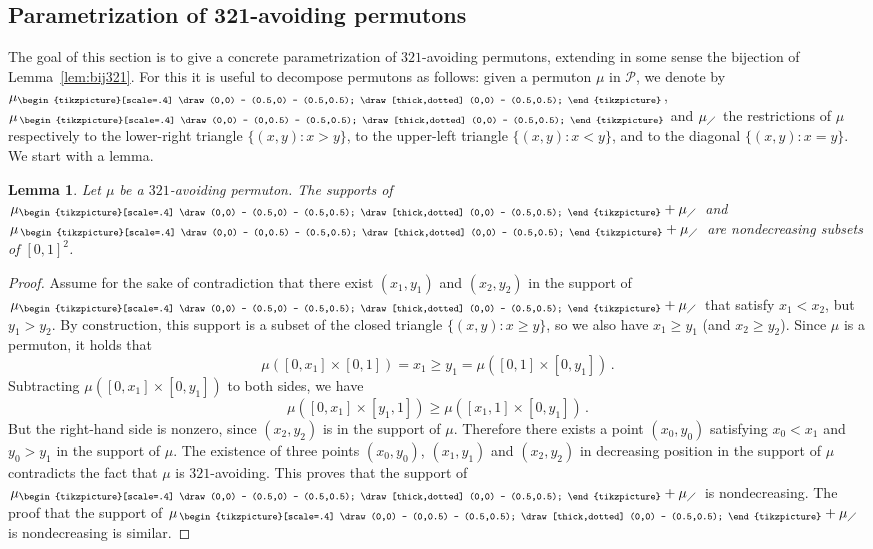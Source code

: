 \documentclass[a4paper,11pt]{amsart}
\DeclareMathOperator{\Leb}{Leb}
\newtheorem{lem}[thm]{Lemma}
\theoremstyle{definition}
\newcommand{\lrtriangle}{{\begin{tikzpicture}[scale=.4]
  \draw (0,0) -- (0.5,0) -- (0.5,0.5);
  \draw[thick,dotted] (0,0) -- (0.5,0.5);
\end{tikzpicture}}}
\newcommand{\ultriangle}{{\, \begin{tikzpicture}[scale=.4]
  \draw (0,0) -- (0,0.5) -- (0.5,0.5);
  \draw[thick,dotted] (0,0) -- (0.5,0.5);
\end{tikzpicture}}}
\begin{document}
\subsection{Parametrization of 321-avoiding permutons}

The goal of this section is to give a concrete parametrization of $321$-avoiding permutons, extending in some sense the bijection of Lemma~\ref{lem:bij321}.
For this it is useful to decompose permutons as follows:
given a permuton $\mu$ in $\mathcal P$, we denote by $\mu_{\lrtriangle}$, $\mu_{\ultriangle}$ and $\mu_{\diagup}$
the restrictions of $\mu$ respectively to the lower-right triangle $\{(x,y): x>y\}$, to the upper-left triangle $\{(x,y): x<y\}$,
and to the diagonal $\{(x,y): x=y\}$.
We start with a lemma.

\begin{lem}\label{lem:incr_supports}
Let $\mu$ be a $321$-avoiding permuton.
The supports of $\mu_{\lrtriangle} + \mu_{\diagup}$ and  $\mu_{\ultriangle} + \mu_{\diagup}$ are nondecreasing subsets of $[0,1]^2$.
\end{lem}

\begin{proof}
    Assume for the sake of contradiction that there exist $(x_1,y_1)$ and $(x_2,y_2)$ in the support of $\mu_{\lrtriangle} + \mu_{\diagup}$ that satisfy $x_1 <x_2$, but $y_1>y_2$. 
    By construction, this support is a subset of the closed triangle $\{(x,y): x\ge y\}$, so we also have $x_1 \ge y_1$ (and $x_2 \ge y_2$).
    Since $\mu$ is a permuton, it holds
    that
    \[ 
        \mu([0,x_1] \times [0,1]) =x_1 \ge y_1 =\mu([0,1] \times [0,y_1]) \,.
    \]
    Subtracting $\mu([0,x_1] \times [0,y_1])$ to both sides, we have
    \[ 
        \mu([0,x_1] \times [y_1,1]) \ge \mu([x_1,1] \times [0,y_1]) \,.
    \]
    But the right-hand side is nonzero, since $(x_2,y_2)$ is in the support of $\mu$.
    Therefore there exists a point $(x_0,y_0)$ satisfying $x_0 <x_1$ and $y_0>y_1$ in the support of $\mu$.
    The existence of three points $(x_0,y_0)$, $(x_1,y_1)$ and $(x_2,y_2)$ in decreasing position in the support of $\mu$ contradicts the fact that $\mu$ is $321$-avoiding.
    This proves that the support of $\mu_{\lrtriangle} + \mu_{\diagup}$ is nondecreasing.
    The proof that the support of $\mu_{\ultriangle} + \mu_{\diagup}$ is nondecreasing is similar.
\end{proof}

\end{document}

